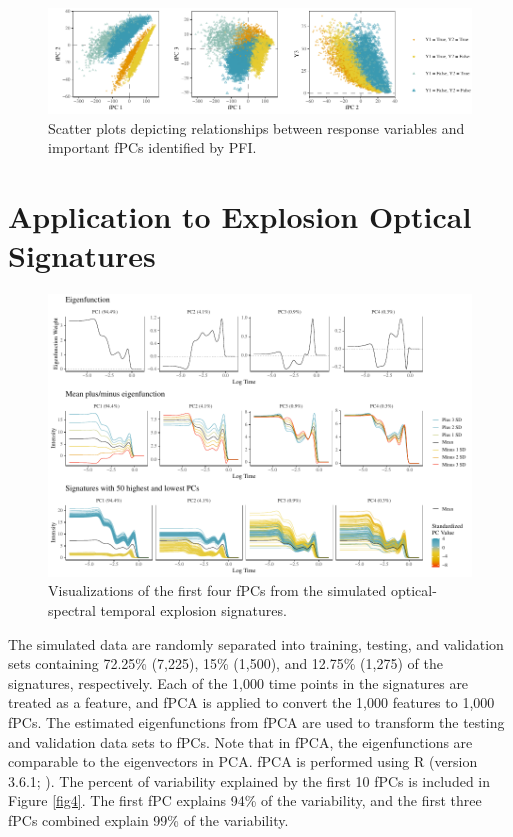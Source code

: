 \documentclass[letterpaper]{article}
\begin{document}
\begin{figure}[t]
\centering
\includegraphics[width=1.95\columnwidth]{fig5}
\caption{Scatter plots depicting relationships between response variables and important fPCs identified by PFI.}
\label{fig5}
\end{figure}

\section{Application to Explosion Optical Signatures} \label{application}

\begin{figure}[t]
\centering
\includegraphics[width=1.95\columnwidth]{fig6}
\caption{Visualizations of the first four fPCs from the simulated optical-spectral temporal explosion signatures.}
\label{fig6}
\end{figure}

The simulated data are randomly separated into training, testing, and validation sets containing 72.25\% (7,225), 15\% (1,500), and 12.75\% (1,275) of the signatures, respectively. Each of the 1,000 time points in the signatures are treated as a feature, and fPCA is applied to convert the 1,000 features to 1,000 fPCs. The estimated eigenfunctions from fPCA are used to transform the testing and validation data sets to fPCs. Note that in fPCA, the eigenfunctions are comparable to the eigenvectors in PCA. fPCA is performed using R (version 3.6.1; \citeauthor{r} \citeyear{r}). The percent of variability explained by the first 10 fPCs is included in Figure \ref{fig4}. The first fPC explains 94\% of the variability, and the first three fPCs combined explain 99\% of the variability. 
\end{document}
